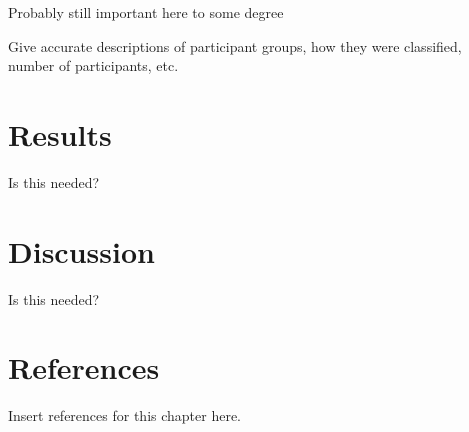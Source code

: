 Probably still important here to some degree

Give accurate descriptions of participant groups, how they were classified, number of participants, etc. 



\section{Results}

Is this needed?



\section{Discussion}
Is this needed?



\section{References}

Insert references for this chapter here.









